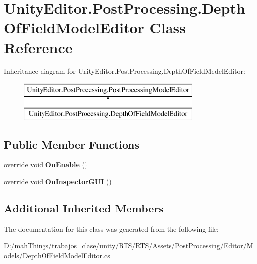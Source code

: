 \hypertarget{class_unity_editor_1_1_post_processing_1_1_depth_of_field_model_editor}{}\section{Unity\+Editor.\+Post\+Processing.\+Depth\+Of\+Field\+Model\+Editor Class Reference}
\label{class_unity_editor_1_1_post_processing_1_1_depth_of_field_model_editor}
Inheritance diagram for Unity\+Editor.\+Post\+Processing.\+Depth\+Of\+Field\+Model\+Editor\+:\begin{figure}[H]
\begin{center}
\leavevmode
\includegraphics[height=2.000000cm]{class_unity_editor_1_1_post_processing_1_1_depth_of_field_model_editor}
\end{center}
\end{figure}
\subsection*{Public Member Functions}
\begin{DoxyCompactItemize}
\item 
\mbox{\label{class_unity_editor_1_1_post_processing_1_1_depth_of_field_model_editor_a734cf645dac2b322e98d85ad7652dd2a}} 
override void {\bfseries On\+Enable} ()
\item 
\mbox{\label{class_unity_editor_1_1_post_processing_1_1_depth_of_field_model_editor_a16d6393fb53a11e086f8caac90166b25}} 
override void {\bfseries On\+Inspector\+G\+UI} ()
\end{DoxyCompactItemize}
\subsection*{Additional Inherited Members}


The documentation for this class was generated from the following file\+:\begin{DoxyCompactItemize}
\item 
D\+:/mah\+Things/trabajos\+\_\+clase/unity/\+R\+T\+S/\+R\+T\+S/\+Assets/\+Post\+Processing/\+Editor/\+Models/Depth\+Of\+Field\+Model\+Editor.\+cs\end{DoxyCompactItemize}
